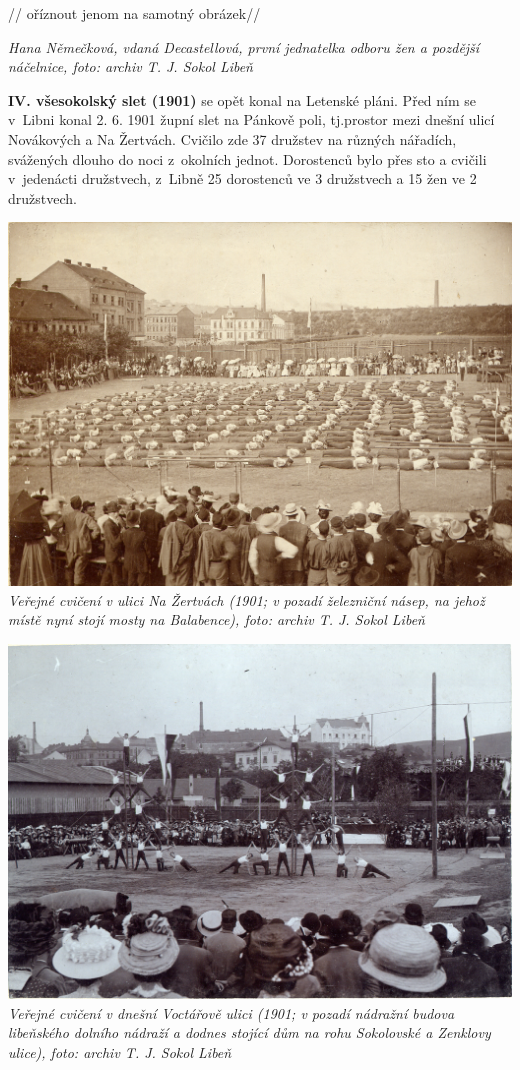 \documentclass[a5paper, 11pt, twoside]{article}
\begin{document}
// oříznout jenom na samotný obrázek//

\textit{Hana Němečková, vdaná Decastellová, první jednatelka odboru žen a pozdější náčelnice, foto: archiv T. J. Sokol Libeň}

\textbf{IV. všesokolský slet (1901)} se opět konal na Letenské pláni. Před ním se v~Libni konal 2. 6. 1901 župní slet na Pánkově poli, tj.prostor mezi dnešní ulicí Novákových a Na Žertvách. Cvičilo zde 37 družstev na různých nářadích, svážených dlouho do noci z~okolních jednot. Dorostenců bylo přes sto a cvičili v~jedenácti družstvech, z~Libně 25 dorostenců ve 3 družstvech a 15 žen ve 2 družstvech.

\includegraphics[width=\textwidth]{img/12_na_zertvach.jpg}
\textit{Veřejné cvičení v ulici Na Žertvách (1901; v pozadí železniční násep, na jehož místě nyní stojí mosty na Balabence), foto: archiv T. J. Sokol Libeň}

\includegraphics[width=\textwidth]{img/13_verejne_cviceni.jpg}
\textit{Veřejné cvičení v dnešní Voctářově ulici (1901; v pozadí nádražní budova libeňského dolního nádraží a dodnes stojící dům na rohu Sokolovské a Zenklovy ulice), foto: archiv T. J. Sokol Libeň}
\end{document}
